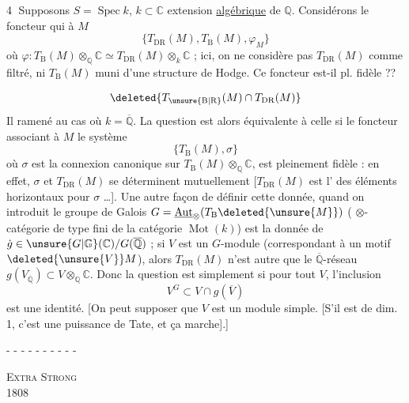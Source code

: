 \textcircled{4}  Supposons $S=\operatorname{Spec}k$, $k\subset\mathbb C$ extension \uline{algébrique} de $\mathbb Q$. Considérons le foncteur qui à $M$ 
\begingroup\makeatletter\tagsleft@true\makeatother
\[
\bigl\{T_{\mathrm{DR}}(M),T_{\mathrm B}(M),\varphi_M\bigr\} \tag*{(4.1)}
\]
\endgroup
où $\varphi:T_{\mathrm B}(M)\otimes_{\mathbb Q}\mathbb C\simeq T_{\mathrm{DR}}(M)\otimes_k\mathbb C$ ; ici, on ne considère pas $T_{\mathrm{DR}}(M)$ comme filtré,  ni $T_{\mathrm B}(M)$ muni d'une structure de Hodge. Ce foncteur est-il pl. fidèle ??

\[
\deleted{T_{\unsure{\mathrm B|\mathrm R}}(M)\cap T_{\mathrm{DR}}(M)}
\]
Il   ramené au cas où $k=\overline{\mathbb Q}$. La question est alors équivalente à celle si le foncteur associant à $M$ le système
\begingroup\makeatletter\tagsleft@true\makeatother
\[
\bigl\{T_{\mathrm B}(M),\sigma\bigr\} \tag*{(4.2)}
\]
\endgroup
où $\sigma$ est la connexion canonique sur $T_{\mathrm B}(M)\otimes_{\mathbb Q}\mathbb C$, est pleinement fidèle : en effet, $\sigma$ et $T_{\mathrm{DR}}(M)$ se déterminent mutuellement [$T_{\mathrm{DR}}(M)$ est l' des éléments  horizontaux pour $\sigma$ \ldots].
Une autre façon de définir cette donnée,  quand on introduit le groupe de Galois $G=\underline{\operatorname{Aut}}_{\otimes}(T_{\mathrm B}\deleted{\unsure{M}})$  ( $\otimes$-catégorie de type fini de la catégorie $\operatorname{Mot}(k)$) est la donnée de $\dot g\in\unsure{G|\mathbb G}(\mathbb C)/G(\overline{\mathbb Q})$ ; si $V$ est un $G$-module (correspondant à un motif $\deleted{\unsure{V}}M$), alors
$T_{\mathrm{DR}}(M)$ n'est autre que le $\overline{\mathbb Q}$-réseau $g(V_{\overline{\mathbb Q}})\subset V\otimes_{\mathbb Q}\mathbb C$. Donc la question est simplement si pour tout $V$, l'inclusion
\[
V^G\subset V\cap g(\overline V)
\]
est une identité. [On peut supposer que $V$ est un module simple. [S'il est de dim. 1, c'est une puissance de Tate, et ça marche].] 
\par\hfill - - - - - - - - - -
\par\noindent\textsc{Extra Strong}\\
 1808


